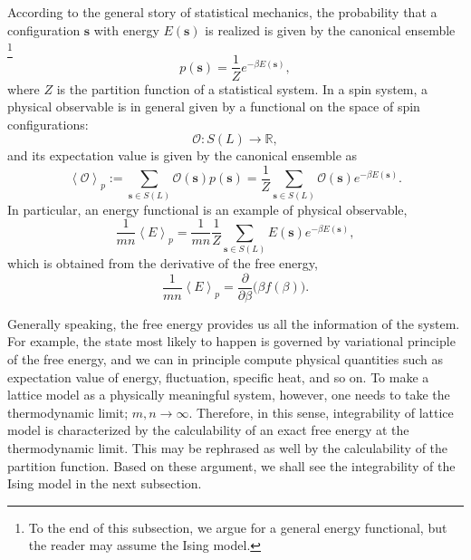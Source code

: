 According to the general story of statistical mechanics, the probability
that a configuration $\mathbf{s}$ with energy $E(\mathbf{s})$
is realized is given by the canonical ensemble%
%
\footnote{To the end of this subsection, we argue for a general energy functional,
but the reader may assume the Ising model. }
%
\begin{equation}
p\left(\mathbf{s}\right)  =  \frac{1}{Z}e^{-\beta E\left(\mathbf{s}\right)},
\end{equation}
where $Z$ is the partition function of a statistical system. In a spin
system, a physical observable is in general given by a functional on
the space of spin configurations:
\begin{equation}
  \mathcal{O}  :  S(L)  \longrightarrow  \mathbb{R},
\end{equation}
and its expectation value is given by the canonical ensemble as
\begin{equation}
\left\langle \mathcal{O}\right\rangle _{p}
  :=\sum_{\mathbf{s}\in S(L)}\mathcal{O}(\mathbf{s})p(\mathbf{s})
    =\frac{1}{Z}\sum_{\mathbf{s}\in S(L)}\mathcal{O}(\mathbf{s})e^{-\beta E(\mathbf{s})}.
\end{equation}
In particular, an energy functional is an example of physical observable,
\begin{equation}
\frac{1}{mn}\left\langle E\right\rangle _{p}
  =\frac{1}{mn}\frac{1}{Z}\sum_{\mathbf{s}\in S(L)}E(\mathbf{s})e^{-\beta E(\mathbf{s})},
\end{equation}
which is obtained from the derivative of the free energy,
\begin{equation}
  \frac{1}{mn}\left\langle E\right\rangle _{p}
    = \frac{\partial}{\partial\beta}\big(\beta f(\beta)\big).
\end{equation}

Generally speaking, the free energy provides us all the information
of the system. For example, the state most likely to happen is governed
by variational principle of the free energy, and we can in principle
compute physical quantities such as expectation value of energy, fluctuation,
specific heat, and so on. To make a lattice model as a physically
meaningful system, however, one needs to take the thermodynamic limit;
$m,n\to\infty$. Therefore, in this sense, integrability of
lattice model is characterized by the calculability of an exact free
energy at the thermodynamic limit. This may be rephrased as well by the calculability
of the partition function. Based on these argument, we shall
see the integrability of the Ising model in the next subsection.





